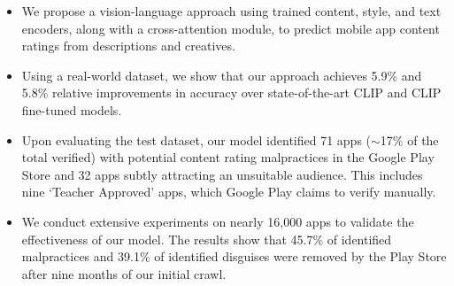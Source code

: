 \begin{itemize}
    \item We propose a vision-language approach using trained content, style, and text encoders, along with a cross-attention module, to predict mobile app content ratings from descriptions and creatives.
    \item  Using a real-world dataset, we show that our approach achieves 5.9\% and 5.8\% relative improvements in accuracy over state-of-the-art CLIP and CLIP fine-tuned models.
    \item Upon evaluating the test dataset, our model identified 71 apps ($\sim$17\% of the total verified) with potential content rating malpractices in the Google Play Store and 32 apps subtly attracting an unsuitable audience. This includes nine `Teacher Approved' apps, which Google Play claims to verify manually.

    \item We conduct extensive experiments on nearly 16,000 apps to validate the effectiveness of our model. The results show that 45.7\% of identified malpractices and 39.1\% of identified disguises were removed by the Play Store after nine months of our initial crawl.
\end{itemize}

